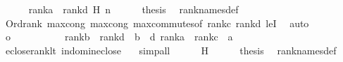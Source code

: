 \begin{isabellebody}
\ \ \ \ \isamarkupfalse%
\ {\isacartoucheopen}rank{\isacharparenleft}{\kern0pt}a{\isacharparenright}{\kern0pt}\ {\isacharless}{\kern0pt}\ rank{\isacharparenleft}{\kern0pt}d{\isacharparenright}{\kern0pt}{\isacartoucheclose}\ H\ n\isanewline
\ \ \ \ \isamarkupfalse%
\ {\isacharquery}{\kern0pt}thesis\ \isamarkupfalse%
\ rank{\isacharunderscore}{\kern0pt}names{\isacharunderscore}{\kern0pt}def\ \isanewline
\ \ \ \ \ \ \isamarkupfalse%
\ Ord{\isacharunderscore}{\kern0pt}rank\ max{\isacharunderscore}{\kern0pt}cong{}\ max{\isacharunderscore}{\kern0pt}cong\ max{\isacharunderscore}{\kern0pt}commutes{\isacharbrackleft}{\kern0pt}of\ {\isachardoublequoteopen}rank{\isacharparenleft}{\kern0pt}c{\isacharparenright}{\kern0pt}{\isachardoublequoteclose}\ {\isachardoublequoteopen}rank{\isacharparenleft}{\kern0pt}d{\isacharparenright}{\kern0pt}{\isachardoublequoteclose}{\isacharbrackright}{\kern0pt}\ leI\ \isamarkupfalse%
\ auto\isanewline
\ \ \isamarkupfalse%
\isanewline
\ \ \ \ \isamarkupfalse%
\ o\isanewline
\ \ \ \ \isamarkupfalse%
\isanewline
\ \ \ \ \isamarkupfalse%
\ {\isachardoublequoteopen}rank{\isacharparenleft}{\kern0pt}b{\isacharparenright}{\kern0pt}\ {\isacharless}{\kern0pt}\ rank{\isacharparenleft}{\kern0pt}d{\isacharparenright}{\kern0pt}{\isachardoublequoteclose}\ {\isacharparenleft}{\kern0pt}\ {\isachardoublequoteopen}{\isacharquery}{\kern0pt}b\ {\isacharless}{\kern0pt}\ {\isacharquery}{\kern0pt}d{\isachardoublequoteclose}{\isacharparenright}{\kern0pt}\ {\isachardoublequoteopen}rank{\isacharparenleft}{\kern0pt}a{\isacharparenright}{\kern0pt}\ {\isacharequal}{\kern0pt}\ rank{\isacharparenleft}{\kern0pt}c{\isacharparenright}{\kern0pt}{\isachardoublequoteclose}\ {\isacharparenleft}{\kern0pt}\ {\isachardoublequoteopen}{\isacharquery}{\kern0pt}a\ {\isacharequal}{\kern0pt}\ {\isacharunderscore}{\kern0pt}{\isachardoublequoteclose}{\isacharparenright}{\kern0pt}\isanewline
\ \ \ \ \ \ \isamarkupfalse%
\ eclose{\isacharunderscore}{\kern0pt}rank{\isacharunderscore}{\kern0pt}lt\ in{\isacharunderscore}{\kern0pt}dom{\isacharunderscore}{\kern0pt}in{\isacharunderscore}{\kern0pt}eclose\ \ \isamarkupfalse%
\ simp{\isacharunderscore}{\kern0pt}all\isanewline
\ \ \ \ \isamarkupfalse%
\ H\isanewline
\ \ \ \ \isamarkupfalse%
\ {\isacharquery}{\kern0pt}thesis\ \isamarkupfalse%
\ rank{\isacharunderscore}{\kern0pt}names{\isacharunderscore}{\kern0pt}def\isanewline

\end{isabellebody}

